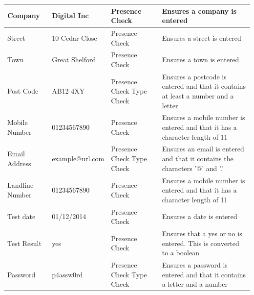 \begin{center}
\begin{longtable}{|p{3cm}|p{2cm}|p{4cm}|p{4cm}|}
        Company          & Digital Inc      & Presence Check                             & Ensures a company is entered\\ \hline
        Street           & 10 Cedar Close   & Presence Check                             & Ensures a street is entered\\ \hline
        Town             & Great Shelford   & Presence Check                             & Ensures a town is entered\\ \hline
        Post Code        & AB12 4XY         & Presence Check \newline Type Check         & Ensures a postcode is entered and that it 
                                                                                           contains at least a number and a letter\\ 
                                                                                           \hline
        Mobile Number    & 01234567890      & Presence Check                             & Ensures a mobile number is entered and that it 
                                                                                           has a character length of 11\\ \hline
        Email Address    & example@url.com  & Presence Check \newline Type Check         & Ensures an email is entered and that it 
                                                                                           contains the characters '@' and '.'\\ \hline
        Landline Number  & 01234567890      & Presence Check                             & Ensures a mobile number is entered and that it 
                                                                                           has a character length of 11\\ \hline
        Test date        & 01/12/2014       & Presence Check                             & Ensures a date is entered\\ \hline
        Test Result      & yes              & Presence Check                             & Ensures that a yes or no is entered. This is 
                                                                                           converted to a boolean\\ \hline
        Password         & p4assw0rd        & Presence Check \newline Type Check         & Ensures a password is entered and that it 
                                                                                           contains a letter and a number\\ \hline
    \end{longtable}

\end{center}


